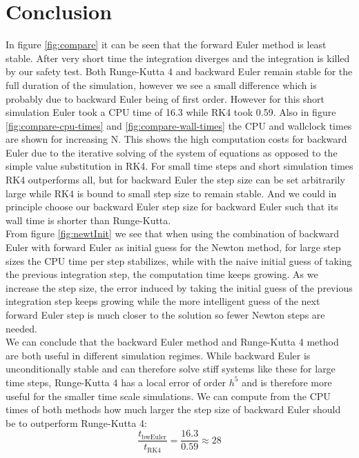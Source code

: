 \documentclass{article}
\begin{document}
\section{Conclusion}
In figure \ref{fig:compare} it can be seen that the forward Euler method is least stable. After very short time the integration diverges and the integration is killed by our safety test. Both Runge-Kutta 4 and backward Euler remain stable for the full duration of the simulation, however we see a small difference which is probably due to backward Euler being of first order. However for this short simulation Euler took a CPU time of 16.3 while RK4 took 0.59. Also in figure \ref{fig:compare-cpu-times} and \ref{fig:compare-wall-times} the CPU and wallclock times are shown for increasing N. This shows the high computation costs for backward Euler due to the iterative solving of the system of equations as opposed to the simple value substitution in RK4. For small time steps and short simulation times RK4 outperforms all, but for backward Euler the step size can be set arbitrarily large while RK4 is bound to small step size to remain stable. And we could in principle choose our backward Euler step size for backward Euler such that its wall time is shorter than Runge-Kutta. \\

From figure \ref{fig:newtInit} we see that when using the combination of backward Euler with forward Euler as initial guess for the Newton method, for large step sizes the CPU time per step stabilizes, while with the naive initial guess of taking the previous integration step, the computation time keeps growing. As we increase the step size, the error induced by taking the initial guess of the previous integration step keeps growing while the more intelligent guess of the next forward Euler step is much closer to the solution so fewer Newton steps are needed. \\

We can conclude that the backward Euler method and Runge-Kutta 4 method are both useful in different simulation regimes. While backward Euler is unconditionally stable and can therefore solve stiff systems like these for large time steps, Runge-Kutta 4 has a local error of order $h^5$ and is therefore more useful for the smaller time scale simulations. We can compute from the CPU times of both methods how much larger the step size of backward Euler should be to outperform Runge-Kutta 4:
\begin{equation}
\frac{t_{\text{bwEuler}}}{t_{\text{RK4}}} = \frac{16.3}{0.59} \approx 28  
\end{equation}
\end{document}
